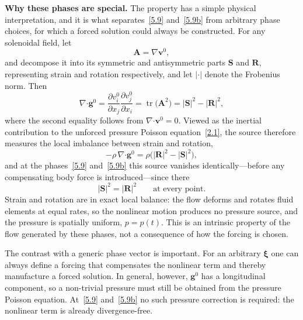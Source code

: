 \documentclass[11pt]{jfm}
\providecommand\bcdot{\boldsymbol{\cdot}}
\numberwithin{equation}{section}
\begin{document}
\medskip
\noindent\textbf{Why these phases are special.} The property has a simple physical
interpretation, and it is what separates~\eqref{5.9} and~\eqref{5.9b} from arbitrary phase choices,
for which a forced solution could always be constructed. For any solenoidal field, let
\[
\boldsymbol{A}=\nabla\boldsymbol{v}^0,
\]
and decompose it into its symmetric and antisymmetric parts $\boldsymbol{S}$ and $\boldsymbol{R}$,
representing strain and rotation respectively, and let $\lvert\cdot\rvert$ denote the Frobenius
norm. Then
\begin{equation}
\label{5.strain}
\nabla\bcdot\boldsymbol{g}^0
=\frac{\partial v_i^0}{\partial x_j}\frac{\partial v_j^0}{\partial x_i}
=\operatorname{tr}\bigl(\boldsymbol{A}^2\bigr)
=\lvert\boldsymbol{S}\rvert^2-\lvert\boldsymbol{R}\rvert^2 ,
\end{equation}
where the second equality follows from $\nabla\bcdot\boldsymbol{v}^0=0$. Viewed as the inertial contribution to the unforced pressure Poisson equation~\eqref{2.1}, the
source therefore measures the local imbalance between strain and rotation,
\[
-\rho\,\nabla\bcdot\boldsymbol{g}^0
=\rho\bigl(\lvert\boldsymbol{R}\rvert^2-\lvert\boldsymbol{S}\rvert^2\bigr),
\]
and at the phases~\eqref{5.9} and~\eqref{5.9b} this source vanishes identically---before any
compensating body force is introduced---since there
\[
\lvert\boldsymbol{S}\rvert^2=\lvert\boldsymbol{R}\rvert^2
\qquad\text{at every point}.
\]
Strain and rotation are in exact local balance: the flow deforms and rotates fluid elements at
equal rates, so the nonlinear motion produces no pressure source, and the pressure is spatially
uniform, $p=p(t)$. This is an intrinsic property of the flow generated by these phases, not a
consequence of how the forcing is chosen.

The contrast with a generic phase vector is important. For an arbitrary $\boldsymbol{\xi}$ one can
always define a forcing that compensates the nonlinear term and thereby manufacture a forced
solution. In general, however, $\boldsymbol{g}^0$ has a longitudinal component, so a non-trivial
pressure must still be obtained from the pressure Poisson equation. At~\eqref{5.9}
and~\eqref{5.9b} no such pressure correction is required: the nonlinear term is already
divergence-free.
\end{document}
